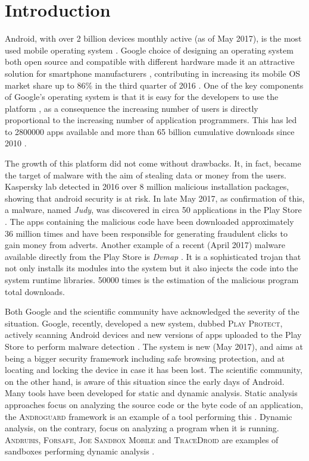 \chapter{Introduction}
\label{chap:introduction}

Android, with over 2 billion devices monthly active (as of May 2017),
is the most used mobile operating system \cite{ref3}. Google choice of
designing an operating system both open source and compatible with
different hardware made it an attractive solution for smartphone
manufacturers \cite{ref6}, contributing in increasing its mobile OS market
share up to 86\% in the third quarter of 2016 \cite{ref7}. One of the key
components of Google's operating system is that it is easy for the
developers to use the platform \cite{ref6}, as a consequence the increasing
number of users is directly proportional to the increasing number of
application programmers. This has led to \num{2800000} apps available and
more than 65 billion cumulative downloads since 2010 \cite{ref8, ref9}.

The growth of this platform did not come without drawbacks. It, in
fact, became the target of malware with the aim of stealing data or
money from the users. Kaspersky lab \cite{ref2} detected in 2016 over 8
million malicious installation packages, showing that android security
is at risk. In late May 2017, as confirmation of this, a malware,
named \emph{Judy}, was discovered in circa 50 applications in the Play Store
\cite{ref5}. The apps containing the malicious code have been downloaded
approximately 36 million times and have been responsible for
generating fraudulent clicks to gain money from adverts. Another
example of a recent (April 2017) malware available directly from the
Play Store is \emph{Dvmap} \cite{ref11}. It is a sophisticated trojan that
not only installs its modules into the system but it also injects the
code into the system runtime libraries. \num{50000} times is the estimation
of the malicious program total downloads.

Both Google and the scientific community have acknowledged the
severity of the situation. Google, recently, developed a new system,
dubbed \textsc{Play Protect}, actively scanning Android devices and new
versions of apps uploaded to the Play Store to perform malware
detection \cite{ref4}. The system is new (May 2017), and aims at being a
bigger security framework including safe browsing protection, and at
locating and locking the device in case it has been lost. The
scientific community, on the other hand, is aware of this situation
since the early days of Android. Many tools have been developed for
static and dynamic analysis. Static analysis approaches focus on analyzing
the source code or the byte code of an application, the \textsc{Androguard}
framework is an example of a tool performing this \cite{ref12}. Dynamic analysis, on the contrary, focus on analyzing a program when it is
running. \textsc{Andrubis}, \textsc{Forsafe}, \textsc{Joe Sandbox Mobile} and \textsc{TraceDroid} are
examples of sandboxes performing dynamic analysis \cite{ref10}.

